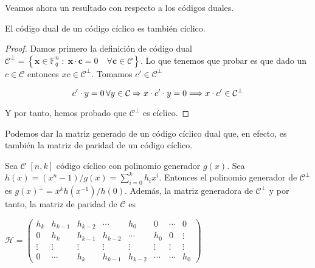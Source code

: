 Veamos ahora un resultado con respecto a los códigos duales.

\begin{theorem}
El código dual de un código cíclico es también cíclico.
\end{theorem}

\begin{proof}
Damos primero la definición de código dual $\mathcal{C}^\perp = \left\{ \textbf{x} \in \mathbb{F}_q^n \; : \; \textbf{x} \cdot \textbf{c} = 0 \quad  \forall \textbf{c} \in \mathcal{C} \right\}$. Lo que tenemos que probar es que dado un $c \in \mathcal{C}$ entonces $xc \in \mathcal{C}^\perp$. Tomamos $c' \in \mathcal{C}^\perp$


\[
	c' \cdot y = 0 \thinspace \forall y \in \mathcal{C} \Rightarrow x \cdot c' \cdot y = 0 \Longrightarrow x \cdot c' \in \mathcal{C}^\perp
\]

Y por tanto, hemos probado que $\mathcal{C}^\perp$ es cíclico.
\end{proof}

Podemos dar la matriz generado de un código cíclico dual que, en efecto, es también la matriz de paridad de un código cíclico.

\begin{theorem}
\label{th:matriz_paridad_ciclico_dual}

Sea $\mathcal{C}$ $[n,k]$ código cíclico con polinomio generador $g(x)$. Sea $h(x)=(x^n-1)/g(x) = \sum_{i=0}^k h_ix^i$. Entonces el polinomio generador de  $\mathcal{C}^\perp$ es $g(x)^\perp = x^kh(x^{-1})/h(0)$. Además, la matriz generadora de  $\mathcal{C}^\perp$ y por tanto, la matriz de paridad de  $\mathcal{C}$ es 

$\mathcal{H} = \begin{pmatrix}
			h_k & h_{k-1} & h_{k-2} & \cdots & h_0 & 0 & \cdots & 0 \\
			0 & h_k & h_{k-1} & h_{k-2} & \cdots & h_0 & 0 & \vdots \\
			\vdots & \vdots & \vdots & \vdots & \vdots &\vdots & \vdots & \vdots \\
			0 & \cdots & h_k & h_{k-1} & h_{k-2} & \cdots & \cdots & h_0 
	\end{pmatrix}$
\end{theorem}

